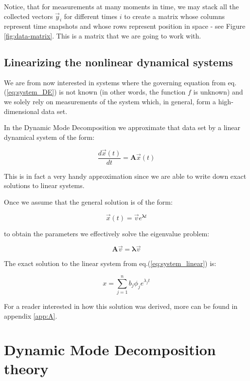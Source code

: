 \documentclass[10pt,twocolumn]{article}
\begin{document}
Notice, that for measurements at many moments in time, we may stack all the collected vectors $\vec{y}_i$ for different times $i$ to create a matrix whose columns represent time snapshots and whose rows represent position in space - see Figure \ref{fig:data-matrix}. This is a matrix that we are going to work with.

\subsection{Linearizing the nonlinear dynamical systems}

We are from now interested in systems where the governing equation from eq.(\ref{eq:system_DE}) is not known (in other words, the function $f$ is unknown) and we solely rely on measurements of the system which, in general, form a high-dimensional data set.

In the Dynamic Mode Decomposition we approximate that data set by a linear dynamical system of the form:

\begin{equation} \label{eq:system_linear}
\frac{d \vec{x}(t)}{dt} = \bm{A} \vec{x}(t)
\end{equation}

This is in fact a very handy approximation since we are able to write down exact solutions to linear systems.

Once we assume that the general solution is of the form:

\begin{equation} \label{eq:general_solution}
\vec{x}(t) = \vec{v} e^{\bm{\lambda} t}
\end{equation}

to obtain the parameters we effectively solve the eigenvalue problem:

\begin{equation} \label{eq:eigenvalue_solution}
\bm{A} \vec{v} = \bm{\lambda} \vec{v}
\end{equation}

The exact solution to the linear system from eq.(\ref{eq:system_linear}) is:

\begin{equation} \label{eq:soln_exact}
x = \sum_{j = 1}^{n} b_j \phi_j e^{\lambda_j t}
\end{equation}

For a reader interested in how this solution was derived, more can be found in appendix \ref{app:A}. 

\section{Dynamic Mode Decomposition theory}\label{sec:theory}
\end{document}
